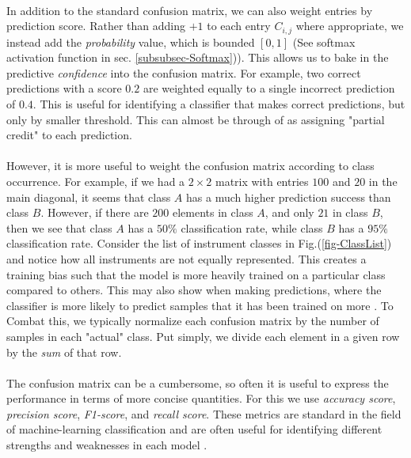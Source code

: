 \documentclass[12pt,letterpaper]{article}
\begin{document}
\paragraph*{}In addition to the standard confusion matrix, we can also weight entries by prediction score. Rather than adding $+1$ to each entry $C_{i,j}$ where appropriate, we instead add the \textit{probability} value, which is bounded $[0,1]$ (See softmax activation function in sec. \ref{subsubsec-Softmax})). This allows us to bake in the predictive \textit{confidence} into the confusion matrix. For example, two correct predictions with a score $0.2$ are weighted equally to a single incorrect prediction of $0.4$. This is useful for identifying a classifier that makes correct predictions, but only by smaller threshold. This can almost be through of as assigning "partial credit" to each prediction.

\paragraph*{}However, it is more useful to weight the confusion matrix according to class occurrence. For example, if we had a $2 \times 2$ matrix with entries $100$ and $20$ in the main diagonal, it seems that class $A$ has a much higher prediction success than class $B$. However, if there are $200$ elements in class $A$, and only $21$ in class $B$, then we see that class $A$ has a $50\%$ classification rate, while class $B$ has a $95\%$ classification rate. Consider the list of instrument classes in Fig.(\ref{fig-ClassList}) and notice how all instruments are not equally represented. This creates a training bias such that the model is more heavily trained on a particular class compared to others. This may also show when making predictions, where the classifier is more likely to predict samples that it has been trained on more \cite{James,Loy}. To Combat this, we typically normalize each confusion matrix by the number of samples in each "actual" class. Put simply, we divide each element in a given row by the \textit{sum} of that row.

\paragraph*{}The confusion matrix can be a cumbersome, so often it is useful to express the performance in terms of more concise quantities. For this we use \textit{accuracy score}, \textit{precision score}, \textit{F1-score}, and \textit{recall score}. These metrics are standard in the field of machine-learning classification and are often useful for identifying different strengths and weaknesses in each model \cite{Geron,James}.
\end{document}
